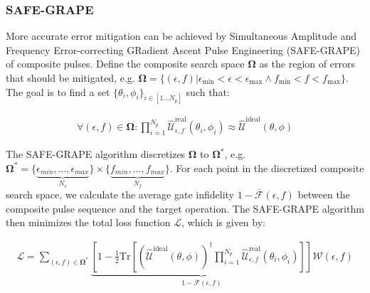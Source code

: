 \documentclass[%
 reprint,
 superscriptaddress,
 amsmath,amssymb,
 aps,
 prx,
]{revtex4-2}
\newcounter{algorithm} %
\begin{document}








\subsubsection{SAFE-GRAPE}

More accurate error mitigation can be achieved by Simultaneous Amplitude and Frequency Error-correcting GRadient Ascent Pulse Engineering (SAFE-GRAPE) of composite pulses. Define the composite search space $\boldsymbol{\Omega}$ as the region of errors that should be mitigated, e.g. $\boldsymbol{\Omega} = \{(\epsilon,f) | \epsilon_{\text{min}}<\epsilon<\epsilon_{\text{max}} \wedge f_{\text{min}}<f<f_{\text{max}} \}$. The goal is to find a set $\{\theta_i , \phi_i \}_{i\in [1...N_p]}$ such that:

\begin{align}
    \forall (\epsilon , f) \in \boldsymbol{\Omega}: \prod_{i=1}^{N_p} \hat{\mathcal{U}}_{\epsilon , f}^{\text{real}}(\theta_i, \phi_i) \approx \hat{\mathcal{U}}^{\text{ideal}}(\theta,\phi)
\end{align}

The SAFE-GRAPE algorithm discretizes $\boldsymbol{\Omega}$ to $\boldsymbol{\Omega}^*$, e.g. $\boldsymbol{\Omega^*} = \{ \underbrace{\epsilon_{min}, ...,\epsilon_{max}}_{N_{\epsilon}} \} \times \{ \underbrace{f_{min}, ...,f_{max}}_{N_{f}}\}$. For each point in the discretized composite search space, we calculate the average gate infidelity $1-\overline{\mathcal{F}}(\epsilon,f)$ between the composite pulse sequence and the target operation. The SAFE-GRAPE algorithm then minimizes the total loss function $\mathcal{L}$, which is given by:

\begin{widetext}
\begin{align}
    \mathcal{L} = \sum_{(\epsilon , f) \in \boldsymbol{\Omega^*}} \underbrace{ \left[ 1 - \frac{1}{2}\text{Tr}\left[ \left( \hat{\mathcal{U}}^{\text{ideal}}(\theta,\phi) \right)^\dagger \prod_{i=1}^{N_p} \hat{\mathcal{U}}_{\epsilon , f}^{\text{real}}(\theta_i, \phi_i) \right] \right] }_{1-\overline{\mathcal{F}}(\epsilon,f)} \mathcal{W}(\epsilon,f) %
\end{align}
\end{widetext}
\end{document}
